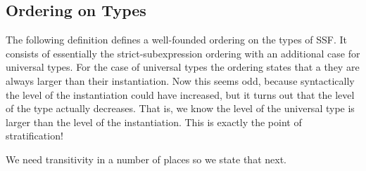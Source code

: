 \subsection{Ordering on Types}
\label{subsec:well-founded_ordering_on_types_ssf}
The following definition defines a well-founded ordering on the types
of SSF.  It consists of essentially the strict-subexpression ordering
with an additional case for universal types.  For the case of
universal types the ordering states that a they are always larger than
their instantiation.  Now this seems odd, because syntactically the
level of the instantiation could have increased, but it turns out that
the level of the type actually decreases.  That is, we know the level
of the universal type is larger than the level of the instantiation.
This is exactly the point of stratification!

\noindent
We need transitivity in a number of places so we state that next.

